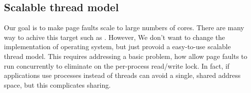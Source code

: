




\subsection{Scalable thread model}

Our goal is to make page faults scale to 
large numbers of cores.
There are many way to achive this target such as \cite{Clements2012Scalable}.
However, We don't want to change the implementation of operating system, 
but just provoid a easy-to-use scalable thread model.
This requires addressing a basic problem,
how allow page faults to run concurrently 
to eliminate on the per-process read/write lock.
In fact, if applications use processes instead of threads can avoid a single, 
shared address space, but this complicates sharing.

